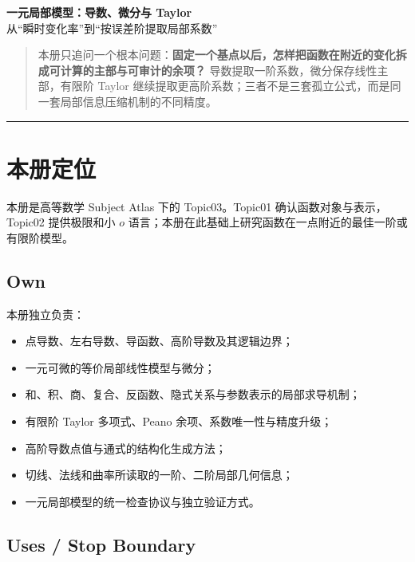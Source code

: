 \documentclass[11pt,a4paper]{ctexart}
\begin{document}
\begin{center}
{\LARGE\textbf{一元局部模型：导数、微分与 Taylor}}\\[0.4em]
{\large 从“瞬时变化率”到“按误差阶提取局部系数”}
\end{center}
\vspace{0.5em}

\begin{quote}
本册只追问一个根本问题：\textbf{固定一个基点以后，怎样把函数在附近的变化拆成可计算的主部与可审计的余项？} 导数提取一阶系数，微分保存线性主部，有限阶 Taylor 继续提取更高阶系数；三者不是三套孤立公式，而是同一套局部信息压缩机制的不同精度。
\end{quote}

\begin{center}\rule{0.5\linewidth}{0.5pt}\end{center}

\setcounter{section}{-1}
\section{本册定位}

本册是高等数学 Subject Atlas 下的 Topic03。Topic01 确认函数对象与表示，Topic02 提供极限和小 $o$ 语言；本册在此基础上研究函数在一点附近的最佳一阶或有限阶模型。

\subsection{Own}

本册独立负责：
\begin{itemize}
  \item 点导数、左右导数、导函数、高阶导数及其逻辑边界；
  \item 一元可微的等价局部线性模型与微分；
  \item 和、积、商、复合、反函数、隐式关系与参数表示的局部求导机制；
  \item 有限阶 Taylor 多项式、Peano 余项、系数唯一性与精度升级；
  \item 高阶导数点值与通式的结构化生成方法；
  \item 切线、法线和曲率所读取的一阶、二阶局部几何信息；
  \item 一元局部模型的统一检查协议与独立验证方式。
\end{itemize}

\subsection{Uses / Stop Boundary}
\end{document}

